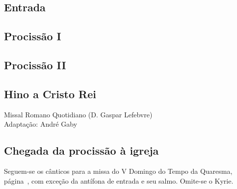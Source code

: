 
\subsection{Entrada}\label{subsection:hebdomada-sancta/dominica-in-palmis-de-passione-domini/psalmi-ad-introitum}

\AllowPageBreak

\subsection{Procissão I}\label{subsection:hebdomada-sancta/dominica-in-palmis-de-passione-domini/ad-processionem-1}

\AllowPageFlush

\subsection{Procissão II}\label{subsection:hebdomada-sancta/dominica-in-palmis-de-passione-domini/ad-processionem-2}

\subsection{Hino a Cristo Rei}\label{subsection:hebdomada-sancta/dominica-in-palmis-de-passione-domini/hymnus-ad-christum-regem}
\begin{annotation}
  Missal Romano Quotidiano (D. Gaspar Lefebvre) \\
  Adaptação: André Gaby
\end{annotation}

\subsection{Chegada da procissão à igreja}\label{subsection:hebdomada-sancta/dominica-in-palmis-de-passione-domini/ingrediente-processione-in-ecclesiam}

\begin{rubrica}
  Seguem-se os cânticos para a missa do V Domingo do Tempo da Quaresma, página~\pageref{section:tempus-quadragesimae/dominica-5}, com exceção da antífona de entrada e seu salmo. Omite-se o Kyrie.
\end{rubrica}